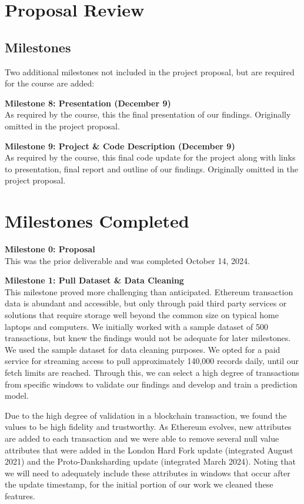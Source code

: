 \documentclass[sigconf]{acmart}
\begin{document}
\section{Proposal Review}
\subsection{Milestones}
Two additional milestones not included in the project proposal, but are required for the course are added:

\textbf{Milestone 8: Presentation (December 9)}\\
As required by the course, this the final presentation of our findings. Originally omitted in the project proposal.

\textbf{Milestone 9: Project \& Code Description (December 9)}\\
As required by the course, this final code update for the project along with links to presentation, final report and outline of our findings. Originally omitted in the project proposal.

\section{Milestones Completed}
\textbf{Milestone 0: Proposal}\\
This was the prior deliverable and was completed October 14, 2024.

\textbf{Milestone 1: Pull Dataset \& Data Cleaning}\\
This milestone proved more challenging than anticipated. Ethereum transaction data is abundant and accessible, but only through paid third party services or solutions that require storage well beyond the common size on typical home laptops and computers. We initially worked with a sample dataset of 500 transactions, but knew the findings would not be adequate for later milestones. We used the sample dataset for data cleaning purposes. We opted for a paid service for streaming access to pull approximately 140,000 records daily, until our fetch limits are reached. Through this, we can select a high degree of transactions from specific windows to validate our findings and develop and train a prediction model.

Due to the high degree of validation in a blockchain transaction, we found the values to be high fidelity and trustworthy. As Ethereum evolves, new attributes are added to each transaction and we were able to remove several null value attributes that were added in the London Hard Fork update \cite{LondonHardfork} (integrated August 2021) and the Proto-Danksharding update \cite{ProtoDanksharding} (integrated March 2024). Noting that we will need to adequately include these attributes in windows that occur after the update timestamp, for the initial portion of our work we cleaned these features.
\end{document}
